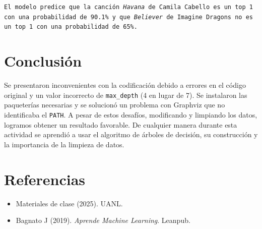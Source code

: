 \documentclass[a4paper,12pt]{article}
\begin{document}
\texttt{El modelo predice que la canción \textit{Havana} de Camila Cabello es un top 1 con una probabilidad de 90.1\% y que \textit{Believer} de Imagine Dragons no es un top 1 con una probabilidad de 65\%.}

\section{Conclusión}
Se presentaron inconvenientes con la codificación debido a errores en el código original y un valor incorrecto de \texttt{max\_depth} (4 en lugar de 7). Se instalaron las paqueterías necesarias y se solucionó un problema con Graphviz que no identificaba el \texttt{PATH}. A pesar de estos desafíos, modificando y limpiando los datos, logramos obtener un resultado favorable. De cualquier manera durante esta actividad se aprendió a usar el algoritmo de árboles de decisión, su construcción y la importancia de la limpieza de datos.

\section{Referencias}
\begin{itemize}
    \item Materiales de clase (2025). UANL.
    \item Bagnato J (2019). \textit{Aprende Machine Learning}. Leanpub.
\end{itemize}
\end{document}
